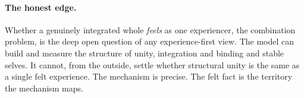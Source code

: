 \paragraph{The honest edge.}
Whether a genuinely integrated whole \emph{feels} as one experiencer, the combination problem,
is the deep open question of any experience-first view. The model can build and measure the
structure of unity, integration and binding and stable selves. It cannot, from the outside,
settle whether structural unity is the same as a single felt experience. The mechanism is
precise. The felt fact is the territory the mechanism maps.
